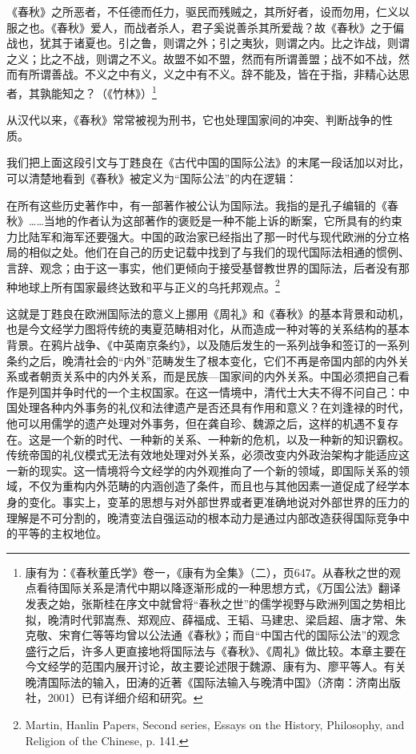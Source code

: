 \documentclass[a4paper, 12pt, openright]{ctexbook}
\renewenvironment{quote}
  {\list{}{\rightmargin2\ccwd \leftmargin2\ccwd \itemindent=2\ccwd \listparindent=2\ccwd}%
   \item\relax\small\kaishu\color{black}}
  {\endlist}
\begin{document}
\begin{quote}
《春秋》之所恶者，不任德而任力，驱民而残贼之，其所好者，设而勿用，仁义以服之也。《春秋》爱人，而战者杀人，君子奚说善杀其所爱哉？故《春秋》之于偏战也，犹其于诸夏也。引之鲁，则谓之外；引之夷狄，则谓之内。比之诈战，则谓之义；比之不战，则谓之不义。故盟不如不盟，然而有所谓善盟；战不如不战，然而有所谓善战。不义之中有义，义之中有不义。辞不能及，皆在于指，非精心达思者，其孰能知之？（《竹林》）\footnote{康有为：《春秋董氏学》卷一，《康有为全集》（二），页647。从春秋之世的观点看待国际关系是清代中期以降逐渐形成的一种思想方式，《万国公法》翻译发表之始，张斯桂在序文中就曾将“春秋之世”的儒学视野与欧洲列国之势相比拟，晚清时代郭嵩焘、郑观应、薛福成、王韬、马建忠、梁启超、唐才常、朱克敬、宋育仁等等均曾以公法通《春秋》；而自“中国古代的国际公法”的观念盛行之后，许多人更直接地将国际法与《春秋》、《周礼》做比较。本章主要在今文经学的范围内展开讨论，故主要论述限于魏源、康有为、廖平等人。有关晚清国际法的输入，田涛的近著《国际法输入与晚清中国》（济南：济南出版社，2001）已有详细介绍和研究。}
\end{quote}

从汉代以来，《春秋》常常被视为刑书，它也处理国家间的冲突、判断战争的性质。

我们把上面这段引文与丁韪良在《古代中国的国际公法》的末尾一段话加以对比，可以清楚地看到《春秋》被定义为“国际公法”的内在逻辑：

\begin{quote}
在所有这些历史著作中，有一部著作被公认为国际法。我指的是孔子编辑的《春秋》……当地的作者认为这部著作的褒贬是一种不能上诉的断案，它所具有的约束力比陆军和海军还要强大。中国的政治家已经指出了那一时代与现代欧洲的分立格局的相似之处。他们在自己的历史记载中找到了与我们的现代国际法相通的惯例、言辞、观念；由于这一事实，他们更倾向于接受基督教世界的国际法，后者没有那种地球上所有国家最终达致和平与正义的乌托邦观点。\footnote{Martin, Hanlin Papers, Second series, Essays on the History, Philosophy, and Religion of the Chinese, p. 141.}
\end{quote}

这就是丁韪良在欧洲国际法的意义上挪用《周礼》和《春秋》的基本背景和动机，也是今文经学力图将传统的夷夏范畴相对化，从而造成一种对等的关系结构的基本背景。在鸦片战争、《中英南京条约》，以及随后发生的一系列战争和签订的一系列条约之后，晚清社会的“内外”范畴发生了根本变化，它们不再是帝国内部的内外关系或者朝贡关系中的内外关系，而是民族—国家间的内外关系。中国必须把自己看作是列国并争时代的一个主权国家。在这一情境中，清代士大夫不得不问自己：中国处理各种内外事务的礼仪和法律遗产是否还具有作用和意义？在刘逢禄的时代，他可以用儒学的遗产处理对外事务，但在龚自珍、魏源之后，这样的机遇不复存在。这是一个新的时代、一种新的关系、一种新的危机，以及一种新的知识霸权。传统帝国的礼仪模式无法有效地处理对外关系，必须改变内外政治架构才能适应这一新的现实。这一情境将今文经学的内外观推向了一个新的领域，即国际关系的领域，不仅为重构内外范畴的内涵创造了条件，而且也与其他因素一道促成了经学本身的变化。事实上，变革的思想与对外部世界或者更准确地说对外部世界的压力的理解是不可分割的，晚清变法自强运动的根本动力是通过内部改造获得国际竞争中的平等的主权地位。
\end{document}
